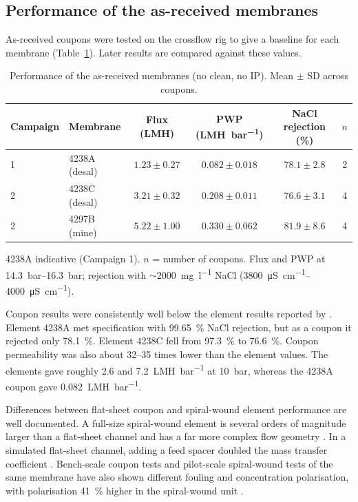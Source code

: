 \subsection{Performance of the as-received membranes}
\label{sec:res-baseline}
As-received coupons were tested on the crossflow rig to give a baseline for each membrane (Table~\ref{tab:baseline}). Later results are compared against these values.

  \begin{table}[htbp]
  \centering
  \caption{Performance of the as-received membranes (no clean, no IP). Mean $\pm$ SD across coupons.}
  \label{tab:baseline}
    \begin{tabular}{llcccc}
    \toprule
    Campaign & Membrane & Flux (\unit{LMH}) & PWP (\unit{LMH.bar^{-1}}) & NaCl rejection (\%) & $n$ \\
    \midrule
    1 & 4238A (desal) & $1.23 \pm 0.27$ & $0.082 \pm 0.018$ & $78.1 \pm 2.8$ & 2 \\
    2 & 4238C (desal) & $3.21 \pm 0.32$ & $0.208 \pm 0.011$ & $76.6 \pm 3.1$ & 4 \\
    2 & 4297B (mine)  & $5.22 \pm 1.00$ & $0.330 \pm 0.062$ & $81.9 \pm 8.6$ & 4 \\
    \bottomrule
  \end{tabular}
  \par\smallskip
  \footnotesize 4238A indicative (Campaign 1). $n$ = number of coupons. Flux and PWP at \qtyrange{14.3}{16.3}{bar}; rejection with $\sim$\qty{2000}{\milli\gram\per\litre} NaCl (\qtyrange{3800}{4000}{\micro\siemens\per\centi\metre}).
  \end{table}

Coupon results were consistently well below the element results reported by \citet{MembraneWorks2025Desal}. Element 4238A met specification with \qty{99.65}{\percent} NaCl rejection, but as a coupon it rejected only \qty{78.1}{\percent}. Element 4238C fell from \qty{97.3}{\percent} to \qty{76.6}{\percent}. Coupon permeability was also about \qtyrange{32}{35}{} times lower than the element values. The elements gave roughly \qty{2.6}{} and \qty{7.2}{LMH.bar^{-1}} at \qty{10}{bar}, whereas the 4238A coupon gave \qty{0.082}{LMH.bar^{-1}}.

Differences between flat-sheet coupon and spiral-wound element performance are well documented. A full-size spiral-wound element is several orders of magnitude larger than a flat-sheet channel and has a far more complex flow geometry \citep{Wei2021}. In a simulated flat-sheet channel, adding a feed spacer doubled the mass transfer coefficient \citep{Wei2021}. Bench-scale coupon tests and pilot-scale spiral-wound tests of the same membrane have also shown different fouling and concentration polarisation, with polarisation \qty{41}{\percent} higher in the spiral-wound unit \citep{Roy2017}.

